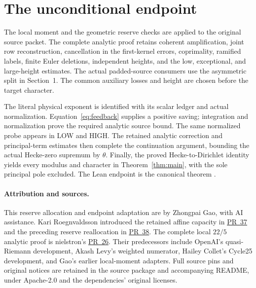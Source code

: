 \documentclass[10pt]{article}
\newcommand{\code}[1]{\texttt{\detokenize{#1}}}
\begin{document}
\section{The unconditional endpoint}
The local moment and the geometric reserve checks are applied to the
original source packet. The complete analytic proof retains coherent
amplification, joint row reconstruction, cancellation in the first-kernel
errors, coprimality, ramified labels, finite Euler deletions, independent
heights, and the low, exceptional, and large-height estimates.
The actual padded-source consumers use the asymmetric split in Section~1.
The common auxiliary losses and height are chosen before the target character.

The literal physical exponent is identified with its scalar ledger and
actual normalization. Equation~\eqref{eq:feedback} supplies a positive saving;
integration and normalization prove the required analytic source bound.
The same normalized probe appears in LOW and HIGH. The retained analytic
correction and principal-term estimates then complete the continuation
argument, bounding the actual Hecke-zero supremum by $\theta$.
Finally, the proved Hecke-to-Dirichlet identity yields every modulus and
character in Theorem~\ref{thm:main}, with the sole principal pole excluded.
The Lean endpoint is the canonical theorem \code{Candidate.bound}.

\paragraph{Attribution and sources.}
This reserve allocation and endpoint adaptation are by Zhongpai Gao, with
AI assistance. Kari Roegnvaldsson introduced the retained affine capacity
in \href{https://github.com/GTimG/QuasiRiemannTracker/pull/37}{PR~37} and
the preceding reserve reallocation in
\href{https://github.com/GTimG/QuasiRiemannTracker/pull/38}{PR~38}.
The complete local $22/5$ analytic proof is nielstron's
\href{https://github.com/GTimG/QuasiRiemannTracker/pull/26}{PR~26}.
Their predecessors include OpenAI's quasi-Riemann development, Akash Levy's
weighted numerator, Hailey Collet's Cycle25 development, and Gao's earlier
local-moment adapters. Full source pins and original notices are retained in
the source package and accompanying README, under Apache-2.0 and the
dependencies' original licenses.
\end{document}
